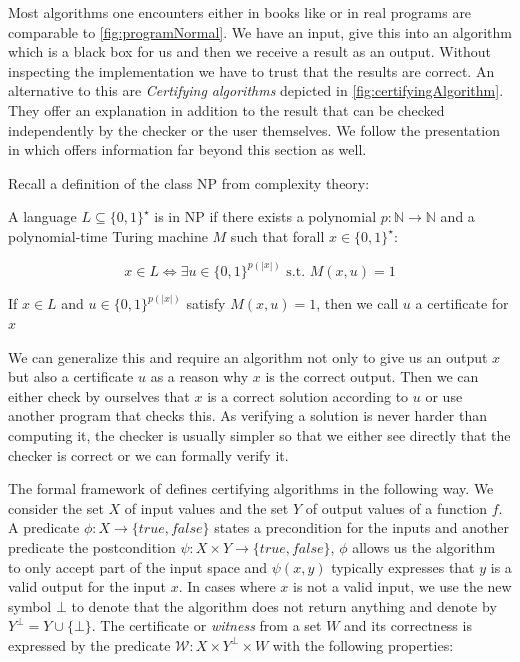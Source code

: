 Most algorithms one encounters either in books like \cite{AlgorithmsBook} or in real programs are comparable to \cref{fig:programNormal}. We have an input, give this into an algorithm which is a black box for us and then we receive a result as an output. Without inspecting the implementation we have to trust that the results are correct.
An alternative to this are \textit{Certifying algorithms} depicted in \cref{fig:certifyingAlgorithm}. They offer an explanation in addition to the result that can be checked independently by the checker or the user themselves. We follow the presentation in \cite{CertAlg} which offers information far beyond this section as well. 

Recall a definition of the class NP from complexity theory:

\begin{definition}
    A language $L \subseteq \{0,1\}^\star$ is in NP if there exists a polynomial $p: \mathbb{N} \to \mathbb{N}$ and a polynomial-time Turing machine $M$ such that forall $x \in \{0,1\}^\star$:

    \[ x \in L  \Leftrightarrow \exists u \in \{0,1\}^{p(|x|)}\text{ s.t. } M(x,u) = 1\]

    If $x \in L$ and $u \in \{0,1\}^{p(|x|)}$ satisfy $M(x,u) = 1$, then we call $u$ a certificate for $x$
\end{definition}

We can generalize this and require an algorithm not only to give us an output $x$ but also a certificate $u$ as a reason why $x$ is the correct output. Then we can either check by ourselves that $x$ is a correct solution according to $u$ or use another program that checks this. As verifying a solution is never harder than computing it, the checker is usually simpler so that we either see directly that the checker is correct or we can formally verify it.

The formal framework of \cite{CertAlg} defines certifying algorithms in the following way. We consider the set $X$ of input values and the set $Y$ of output values of a function $f$. A predicate $\phi: X \to \{true, false\}$ states a precondition for the inputs and another predicate the postcondition $\psi: X \times Y \to \{true, false\}$, $\phi$ allows us the algorithm to only accept part of the input space and $\psi(x,y)$ typically expresses that $y$ is a valid output for the input $x$. In cases where $x$ is not a valid input, we use the new symbol $\bot$ to denote that the algorithm does not return anything and denote by $Y^\bot = Y \cup \{\bot\}$.
The certificate or \textit{witness} from a set $W$ and its correctness is expressed by the predicate $\mathcal{W}: X \times Y^\bot \times W$ with the following properties:

